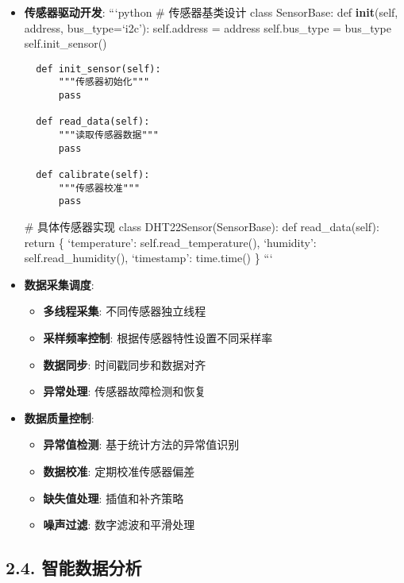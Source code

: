 \begin{itemize}
\item
  \textbf{传感器驱动开发}: ```python \# 传感器基类设计 class SensorBase:
  def \textbf{init}(self, address, bus\_type=`i2c'): self.address =
  address self.bus\_type = bus\_type self.init\_sensor()

\begin{lstlisting}
  def init_sensor(self):
      """传感器初始化"""
      pass

  def read_data(self):
      """读取传感器数据"""
      pass

  def calibrate(self):
      """传感器校准"""
      pass
\end{lstlisting}

  \# 具体传感器实现 class DHT22Sensor(SensorBase): def read\_data(self):
  return \{ `temperature': self.read\_temperature(), `humidity':
  self.read\_humidity(), `timestamp': time.time() \} ```
\item
  \textbf{数据采集调度}:

  \begin{itemize}
  \tightlist
  \item
    \textbf{多线程采集}: 不同传感器独立线程
  \item
    \textbf{采样频率控制}: 根据传感器特性设置不同采样率
  \item
    \textbf{数据同步}: 时间戳同步和数据对齐
  \item
    \textbf{异常处理}: 传感器故障检测和恢复
  \end{itemize}
\item
  \textbf{数据质量控制}:

  \begin{itemize}
  \tightlist
  \item
    \textbf{异常值检测}: 基于统计方法的异常值识别
  \item
    \textbf{数据校准}: 定期校准传感器偏差
  \item
    \textbf{缺失值处理}: 插值和补齐策略
  \item
    \textbf{噪声过滤}: 数字滤波和平滑处理
  \end{itemize}
\end{itemize}

\subsection{2.4.
智能数据分析}\label{ux667aux80fdux6570ux636eux5206ux6790}

